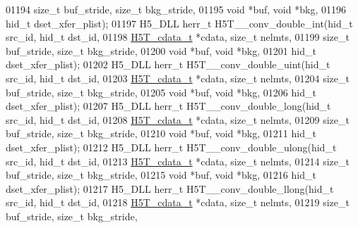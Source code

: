 \begin{DoxyCode}
01194                      \textcolor{keywordtype}{size\_t} buf\_stride, \textcolor{keywordtype}{size\_t} bkg\_stride,
01195                                      \textcolor{keywordtype}{void} *buf, \textcolor{keywordtype}{void} *bkg,
01196                                      hid\_t dset\_xfer\_plist);
01197 H5\_DLL herr\_t H5T\_\_conv\_double\_int(hid\_t src\_id, hid\_t dst\_id,
01198                      \hyperlink{struct_h5_t__cdata__t}{H5T\_cdata\_t} *cdata, \textcolor{keywordtype}{size\_t} nelmts,
01199                      \textcolor{keywordtype}{size\_t} buf\_stride, \textcolor{keywordtype}{size\_t} bkg\_stride,
01200                                      \textcolor{keywordtype}{void} *buf, \textcolor{keywordtype}{void} *bkg,
01201                                      hid\_t dset\_xfer\_plist);
01202 H5\_DLL herr\_t H5T\_\_conv\_double\_uint(hid\_t src\_id, hid\_t dst\_id,
01203                      \hyperlink{struct_h5_t__cdata__t}{H5T\_cdata\_t} *cdata, \textcolor{keywordtype}{size\_t} nelmts,
01204                      \textcolor{keywordtype}{size\_t} buf\_stride, \textcolor{keywordtype}{size\_t} bkg\_stride,
01205                                      \textcolor{keywordtype}{void} *buf, \textcolor{keywordtype}{void} *bkg,
01206                                      hid\_t dset\_xfer\_plist);
01207 H5\_DLL herr\_t H5T\_\_conv\_double\_long(hid\_t src\_id, hid\_t dst\_id,
01208                      \hyperlink{struct_h5_t__cdata__t}{H5T\_cdata\_t} *cdata, \textcolor{keywordtype}{size\_t} nelmts,
01209                      \textcolor{keywordtype}{size\_t} buf\_stride, \textcolor{keywordtype}{size\_t} bkg\_stride,
01210                                      \textcolor{keywordtype}{void} *buf, \textcolor{keywordtype}{void} *bkg,
01211                                      hid\_t dset\_xfer\_plist);
01212 H5\_DLL herr\_t H5T\_\_conv\_double\_ulong(hid\_t src\_id, hid\_t dst\_id,
01213                      \hyperlink{struct_h5_t__cdata__t}{H5T\_cdata\_t} *cdata, \textcolor{keywordtype}{size\_t} nelmts,
01214                      \textcolor{keywordtype}{size\_t} buf\_stride, \textcolor{keywordtype}{size\_t} bkg\_stride,
01215                                      \textcolor{keywordtype}{void} *buf, \textcolor{keywordtype}{void} *bkg,
01216                                      hid\_t dset\_xfer\_plist);
01217 H5\_DLL herr\_t H5T\_\_conv\_double\_llong(hid\_t src\_id, hid\_t dst\_id,
01218                      \hyperlink{struct_h5_t__cdata__t}{H5T\_cdata\_t} *cdata, \textcolor{keywordtype}{size\_t} nelmts,
01219                      \textcolor{keywordtype}{size\_t} buf\_stride, \textcolor{keywordtype}{size\_t} bkg\_stride,

\end{DoxyCode}
